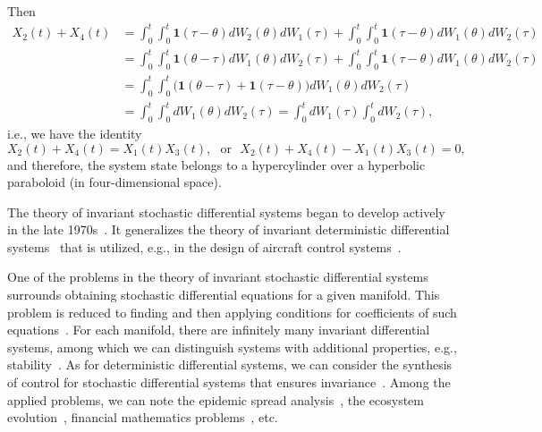 \documentclass[10pt,reqno]{amsart}
\theoremstyle{plain}
\theoremstyle{remark}
\begin{document}
Then
\begin{align*}
  X_2(t) + X_4(t) & = \int_0^t \int_0^t {\mathbf{1}(\tau-\theta) dW_2(\theta) dW_1(\tau)} + \int_0^t \int_0^t {\mathbf{1}(\tau-\theta) dW_1(\theta) dW_2(\tau)} \\
  & = \int_0^t \int_0^t {\mathbf{1}(\theta-\tau) dW_1(\theta) dW_2(\tau)} + \int_0^t \int_0^t {\mathbf{1}(\tau-\theta) dW_1(\theta) dW_2(\tau)} \\
  & = \int_0^t \int_0^t {\bigl( \mathbf{1}(\theta-\tau) + \mathbf{1}(\tau-\theta) \bigr) dW_1(\theta) dW_2(\tau)} \\
  & = \int_0^t \int_0^t {dW_1(\theta) dW_2(\tau)} = \int_0^t dW_1(\tau) \int_0^t dW_2(\tau),
\end{align*}
i.e., we have the identity
\[
  X_2(t) + X_4(t) = X_1(t) X_3(t), \ \ \ \text{or} \ \ \ X_2(t) + X_4(t) - X_1(t) X_3(t) = 0,
\]
and therefore, the system state belongs to a hypercylinder over a hyperbolic paraboloid (in four-dimensional space).

The theory of invariant stochastic differential systems began to develop actively in the late 1970s~\cite{Dub_78, KryRoz_UMN82}. It generalizes the theory of invariant deterministic differential systems~\cite{Eru_PMM52, Muh_DU69, Muh_DU71, Gal_86, Gal_16} that is utilized, e.g., in the design of aircraft control systems~\cite{GalZar_87, Khru_87, Gor_VMAI12}.

One of the problems in the theory of invariant stochastic differential systems surrounds obtaining stochastic differential equations for a given manifold. This problem is reduced to finding and then applying conditions for coefficients of such equations~\cite{Dub_89, Kar_15, Tle_DU14}. For each manifold, there are infinitely many invariant differential systems, among which we can distinguish systems with additional properties, e.g., stability~\cite{TleVas_OM21}. As for deterministic differential systems, we can consider the synthesis of control for stochastic differential systems that ensures invariance~\cite{Kar_15, Kar_21}. Among the applied problems, we can note the epidemic spread analysis~\cite{Kar_21}, the ecosystem evolution~\cite{Kar_21}, financial mathematics problems~\cite{KarPet_NEFU18}, etc.
\end{document}
